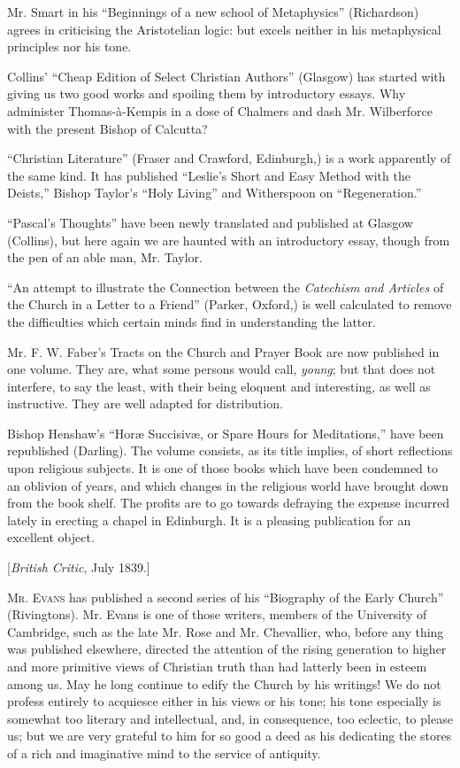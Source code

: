 Mr. Smart in his ``Beginnings of a new school of
Metaphysics'' (Richardson) agrees in criticising the Aristotelian logic:
but excels neither in his metaphysical principles nor his tone.

Collins' ``Cheap Edition of Select Christian Authors''
(Glasgow) has started with giving us two good works and spoiling them by
introductory essays. Why administer Thomas-à-Kempis in a dose of
Chalmers and dash Mr. Wilberforce with the present Bishop of Calcutta?

``Christian Literature'' (Fraser and Crawford,
Edinburgh,) is a work apparently of the same kind. It has published ``Leslie's
Short and Easy Method with the Deists,'' Bishop Taylor's ``Holy Living''
and Witherspoon on ``Regeneration.''

``Pascal's Thoughts'' have been newly translated and
published at Glasgow (Collins), but here again we are haunted with
an introductory essay, though from the pen of an able man, Mr. Taylor.

``An attempt to illustrate the Connection between
the \emph{Catechism and Articles} of the Church in a Letter to a Friend''
(Parker, Oxford,) is well calculated to remove the difficulties which
certain minds find in understanding the latter.

Mr. F. W. Faber's Tracts on the Church and Prayer
Book are now published in one volume. They are, what some persons would
call, \emph{young}; but that does not interfere, to say the least, with
their being eloquent and interesting, as well as instructive. They are
well adapted for distribution.

Bishop Henshaw's ``Horæ Succisivæ, or Spare Hours
for Meditations,'' have been republished (Darling). The volume consists,
as its title implies, of short reflections upon religious subjects. It
is one of those books which have been condemned to an oblivion of years,
and which changes in the religious world have brought down from the book
shelf. The profits are to go towards defraying the expense incurred
lately in erecting a chapel in Edinburgh. It is a pleasing publication
for an excellent object.


[\emph{British Critic}, July 1839.]

M\textsc{r}. E\textsc{vans}
has published a second series of his ``Biography of the Early Church'' (Rivingtons).
Mr. Evans is one of those writers, members of the University of
Cambridge, such as the late Mr. Rose and Mr. Chevallier, who, before any
thing was published elsewhere, directed the attention of the rising
generation to higher and more primitive views of Christian truth than
had latterly been in esteem among us. May he long continue to edify the
Church by his writings! We do not profess entirely to acquiesce either
in his views or his tone; his tone especially is somewhat too literary
and intellectual, and, in consequence, too eclectic, to please us; but
we are very grateful to him for so good a deed as his dedicating the
stores of a rich and imaginative mind to the service of antiquity.

